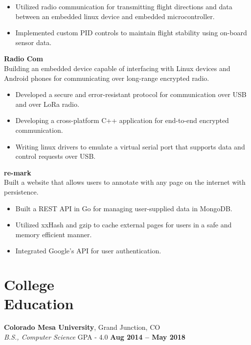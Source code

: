 \documentclass[margin,line]{resume}
\begin{document}
\begin{resume}
	\begin{itemize}
	\item Utilized radio communication for transmitting
	      flight directions and data between an embedded linux
	      device and embedded microcontroller.
	\item Implemented custom PID controls to maintain flight stability
	      using on-board sensor data.
	\end{itemize}

    \textbf{Radio Com}\\
    Building an embedded device capable of interfacing with Linux devices and
    Android phones for communicating over long-range encrypted radio.

        \begin{itemize}
        \item Developed a secure and error-resistant protocol for communication
              over USB and over LoRa radio.
        \item Developing a cross-platform C++ application for end-to-end encrypted
              communication.
        \item Writing linux drivers to emulate a virtual serial port that supports
              data and control requests over USB.
	\end{itemize}


    \textbf{re-mark}\\
    Built a website that allows users to annotate with any page on the internet
    with persistence.

        \begin{itemize}
        \item Built a REST API in Go for managing user-supplied data in MongoDB.
        \item Utilized xxHash and gzip to cache external pages for users in
              a safe and memory efficient manner.
        \item Integrated Google's API for user authentication.
        \end{itemize}

    \section{\mysidestyle College\\Education}

    \textbf{Colorado Mesa University}, Grand Junction, CO \vspace{2mm}\\\vspace{1mm}%
    \textsl{B.S., Computer Science} GPA - 4.0 \hfill \textbf{Aug 2014 -- May 2018}


\end{resume}
\end{document}

